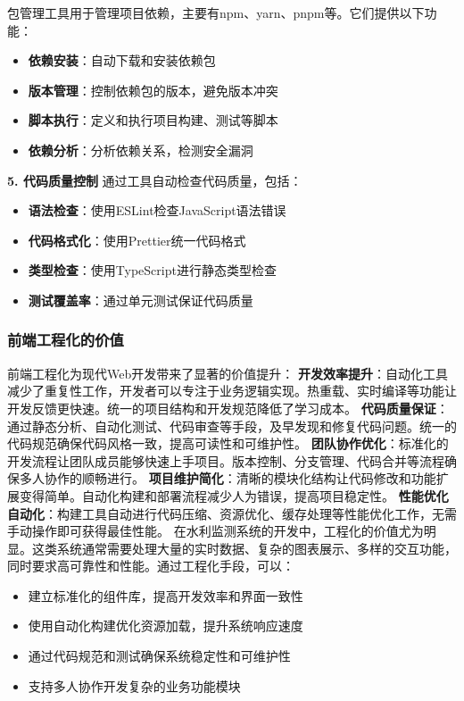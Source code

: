 包管理工具用于管理项目依赖，主要有npm、yarn、pnpm等。它们提供以下功能： \begin{itemize} \tightlist \item \textbf{依赖安装}：自动下载和安装依赖包 \item
\textbf{版本管理}：控制依赖包的版本，避免版本冲突 \item \textbf{脚本执行}：定义和执行项目构建、测试等脚本 \item \textbf{依赖分析}：分析依赖关系，检测安全漏洞 \end{itemize}
\textbf{5. 代码质量控制} 通过工具自动检查代码质量，包括： \begin{itemize} \tightlist \item \textbf{语法检查}：使用ESLint检查JavaScript语法错误 \item
\textbf{代码格式化}：使用Prettier统一代码格式 \item \textbf{类型检查}：使用TypeScript进行静态类型检查 \item \textbf{测试覆盖率}：通过单元测试保证代码质量 \end{itemize}
\subsubsection{前端工程化的价值}\label{ux524dux7aefux5de5ux7a0bux5316ux7684ux4ef7ux503c} 前端工程化为现代Web开发带来了显著的价值提升：
\textbf{开发效率提升}：自动化工具减少了重复性工作，开发者可以专注于业务逻辑实现。热重载、实时编译等功能让开发反馈更快速。统一的项目结构和开发规范降低了学习成本。
\textbf{代码质量保证}：通过静态分析、自动化测试、代码审查等手段，及早发现和修复代码问题。统一的代码规范确保代码风格一致，提高可读性和可维护性。
\textbf{团队协作优化}：标准化的开发流程让团队成员能够快速上手项目。版本控制、分支管理、代码合并等流程确保多人协作的顺畅进行。
\textbf{项目维护简化}：清晰的模块化结构让代码修改和功能扩展变得简单。自动化构建和部署流程减少人为错误，提高项目稳定性。
\textbf{性能优化自动化}：构建工具自动进行代码压缩、资源优化、缓存处理等性能优化工作，无需手动操作即可获得最佳性能。
在水利监测系统的开发中，工程化的价值尤为明显。这类系统通常需要处理大量的实时数据、复杂的图表展示、多样的交互功能，同时要求高可靠性和性能。通过工程化手段，可以： \begin{itemize} \tightlist \item
建立标准化的组件库，提高开发效率和界面一致性 \item 使用自动化构建优化资源加载，提升系统响应速度 \item 通过代码规范和测试确保系统稳定性和可维护性 \item 支持多人协作开发复杂的业务功能模块 \end{itemize}
